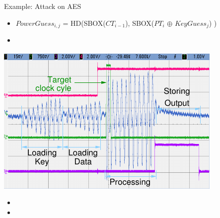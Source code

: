 \documentclass[final]{beamer}
\begin{document}
\begin{frame}[fragile]{}
\begin{columns}[t]
\begin{column}{.31\linewidth}
\begin{block}{Example: Attack on AES}
\begin{center}
         \end{center}
         \begin{itemize}
		 \item {\small $PowerGuess_{i, j}$ = HD(SBOX($CT_{i-1}$), SBOX($PT_{i}$ $\oplus$ $KeyGuess_{j}$) )}
		 \item
         \end{itemize}
	 \begin{minipage}[t]{0.49\linewidth}
			\includegraphics[width=0.80\linewidth]{../figures/oscilloscope-all-4ch} 
	 
	 \end{minipage}%
	 \begin{minipage}[t]{0.49\linewidth}  
		 \vspace{-6cm}
		 \begin{itemize}
		  \item 
		  \item 
		 \end{itemize}
         \end{minipage} 
	 

\end{block}
\end{column}
\end{columns}
\end{frame}
\end{document}
